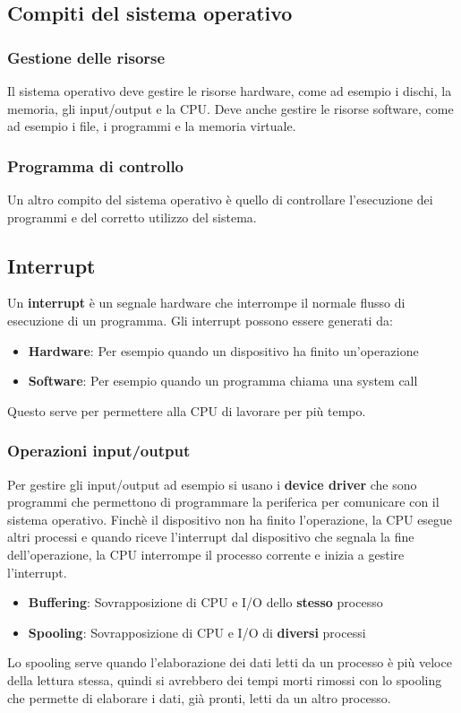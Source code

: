 \documentclass[a4paper]{article}
\begin{document}
\subsection{Compiti del sistema operativo}
\subsubsection{Gestione delle risorse}
Il sistema operativo deve gestire le risorse hardware, come ad esempio i dischi, la memoria,
gli input/output e la CPU. Deve anche gestire le risorse software, come ad esempio i file,
i programmi e la memoria virtuale.

\subsubsection{Programma di controllo}
Un altro compito del sistema operativo è quello di controllare l'esecuzione dei programmi
e del corretto utilizzo del sistema.

\subsection{Interrupt}
Un \textbf{interrupt} è un segnale hardware che interrompe il normale flusso di esecuzione
di un programma. Gli interrupt possono essere generati da:
\begin{itemize}
  \item \textbf{Hardware}: Per esempio quando un dispositivo ha finito un'operazione
  \item \textbf{Software}: Per esempio quando un programma chiama una system call
\end{itemize}
Questo serve per permettere alla CPU di lavorare per più tempo.

\subsubsection{Operazioni input/output}
Per gestire gli input/output
ad esempio si usano i \textbf{device driver} che sono programmi che permettono di
programmare la periferica per comunicare con il sistema operativo. Finchè il dispositivo
non ha finito l'operazione, la CPU esegue altri processi e quando riceve l'interrupt
dal dispositivo che segnala la fine dell'operazione, la CPU interrompe il processo
corrente e inizia a gestire l'interrupt.

\begin{itemize}
  \item \textbf{Buffering}: Sovrapposizione di CPU e I/O dello \textbf{stesso} processo
  \item \textbf{Spooling}: Sovrapposizione di CPU e I/O di \textbf{diversi} processi
\end{itemize}
Lo spooling serve quando l'elaborazione dei dati letti da un processo è più veloce
della lettura stessa, quindi si avrebbero dei tempi morti rimossi con lo spooling che
permette di elaborare i dati, già pronti, letti da un altro processo.
\end{document}
